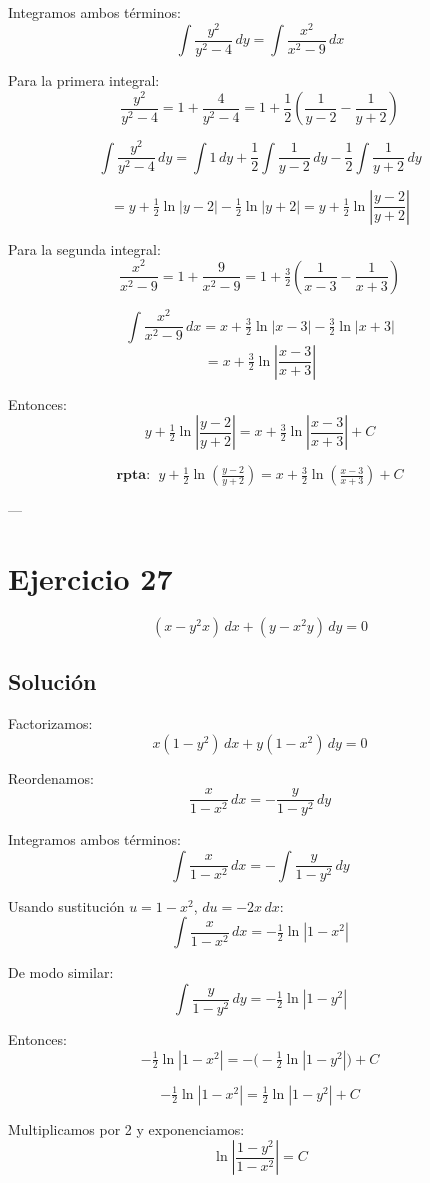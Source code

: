 \documentclass[12pt,a4paper]{article}
\begin{document}
\begin{multicols}{2}
Integramos ambos términos:
\[
\int \frac{y^2}{y^2-4}\,dy = \int \frac{x^2}{x^2-9}\,dx
\]

Para la primera integral:
\[
\frac{y^2}{y^2-4} = 1 + \frac{4}{y^2-4}
= 1 + \frac{1}{2}\left(\frac{1}{y-2}-\frac{1}{y+2}\right)
\]

\[
\int \frac{y^2}{y^2-4}\,dy
= \int 1\,dy + \frac{1}{2}\int \frac{1}{y-2}\,dy - \frac{1}{2}\int \frac{1}{y+2}\,dy
\]

\[
= y + \tfrac{1}{2}\ln|y-2| - \tfrac{1}{2}\ln|y+2|
= y + \tfrac{1}{2}\ln\!\left|\frac{y-2}{y+2}\right|
\]

Para la segunda integral:
\[
\frac{x^2}{x^2-9} = 1 + \frac{9}{x^2-9}
= 1 + \tfrac{3}{2}\left(\frac{1}{x-3}-\frac{1}{x+3}\right)
\]

\[
\int \frac{x^2}{x^2-9}\,dx
= x + \tfrac{3}{2}\ln|x-3| - \tfrac{3}{2}\ln|x+3|\]
\[= x + \tfrac{3}{2}\ln\!\left|\frac{x-3}{x+3}\right|
\]

Entonces:
\[
y + \tfrac{1}{2}\ln\!\left|\frac{y-2}{y+2}\right|
= x + \tfrac{3}{2}\ln\!\left|\frac{x-3}{x+3}\right| + C
\]

\[
\textbf{rpta: } \; y + \tfrac{1}{2}\ln\!\left(\tfrac{y-2}{y+2}\right) = x + \tfrac{3}{2}\ln\!\left(\tfrac{x-3}{x+3}\right)+C
\]

---

\section*{Ejercicio 27}
\[
(x-y^2x)\,dx+(y-x^2y)\,dy=0
\]

\subsection*{Solución}
Factorizamos:
\[
x(1-y^2)\,dx + y(1-x^2)\,dy=0
\]

Reordenamos:
\[
\frac{x}{1-x^2}\,dx = -\frac{y}{1-y^2}\,dy
\]

Integramos ambos términos:
\[
\int \frac{x}{1-x^2}\,dx = -\int \frac{y}{1-y^2}\,dy
\]

Usando sustitución $u=1-x^2$, $du=-2x\,dx$:
\[
\int \frac{x}{1-x^2}\,dx = -\tfrac{1}{2}\ln|1-x^2|
\]

De modo similar:
\[
\int \frac{y}{1-y^2}\,dy = -\tfrac{1}{2}\ln|1-y^2|
\]

Entonces:
\[
-\tfrac{1}{2}\ln|1-x^2| = -\Big(-\tfrac{1}{2}\ln|1-y^2|\Big) + C
\]

\[
-\tfrac{1}{2}\ln|1-x^2| = \tfrac{1}{2}\ln|1-y^2|+C
\]

Multiplicamos por 2 y exponenciamos:
\[
\ln\!\left|\frac{1-y^2}{1-x^2}\right| = C
\]


\end{multicols}
\end{document}
